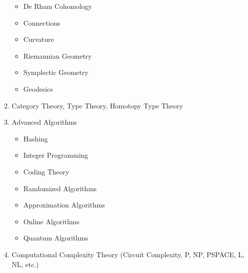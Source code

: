 \documentclass[12pt]{article}
\begin{document}
\begin{enumerate}
\begin{itemize}
        \item De Rham Cohomology
        \item Connections
        \item Curvature
        \item Riemannian Geometry
        \item Symplectic Geometry
        \item Geodesics
    \end{itemize}
    \item Category Theory, Type Theory, Homotopy Type Theory
    \item Advanced Algorithms 
    \begin{itemize}
        \item Hashing
        \item Integer Programming
        \item Coding Theory
        \item Randomized Algorithms
        \item Approximation Algorithms
        \item Online Algorithms
        \item Quantum Algorithms
    \end{itemize}
    \item Computational Complexity Theory (Circuit Complexity, P, NP, PSPACE, L, NL, etc.)
\end{enumerate}
\end{document}
